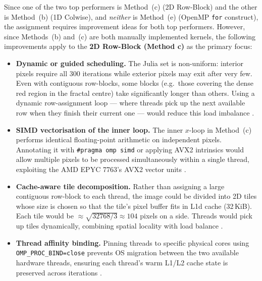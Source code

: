 Since one of the two top performers is Method~(c) (2D Row-Block) and the other is
Method~(b) (1D Colwise), and \emph{neither} is Method~(e) (OpenMP \texttt{for}
construct), the assignment requires improvement ideas for both top performers.
However, since Methods~(b) and~(c) are both manually implemented kernels, the
following improvements apply to the \textbf{2D Row-Block (Method c)} as the primary
focus:

\begin{itemize}
  \item \textbf{Dynamic or guided scheduling.}
        The Julia set is non-uniform: interior pixels require all 300 iterations while
        exterior pixels may exit after very few.
        Even with contiguous row-blocks, some blocks (e.g.\ those covering the dense
        red region in the fractal centre) take significantly longer than others.
        Using a dynamic row-assignment loop — where threads pick up the next available
        row when they finish their current one — would reduce this load imbalance
        \citep{chapman2007using}.

  \item \textbf{SIMD vectorisation of the inner loop.}
        The inner $x$-loop in Method~(c) performs identical floating-point arithmetic
        on independent pixels.
        Annotating it with \texttt{\#pragma omp simd} or applying AVX2 intrinsics
        would allow multiple pixels to be processed simultaneously within a single
        thread, exploiting the AMD EPYC 7763's AVX2 vector units
        \citep{trobec2018introduction}.

  \item \textbf{Cache-aware tile decomposition.}
        Rather than assigning a large contiguous row-block to each thread, the image
        could be divided into 2D tiles whose size is chosen so that the tile's pixel
        buffer fits in L1d cache (32\,KiB).
        Each tile would be $\approx\sqrt{32768/3} \approx 104$ pixels on a side.
        Threads would pick up tiles dynamically, combining spatial locality with load
        balance \citep{grama2003introduction}.

  \item \textbf{Thread affinity binding.}
        Pinning threads to specific physical cores using \texttt{OMP\_PROC\_BIND=close}
        prevents OS migration between the two available hardware threads, ensuring each
        thread's warm L1/L2 cache state is preserved across iterations
        \citep{chapman2007using}.
\end{itemize}

